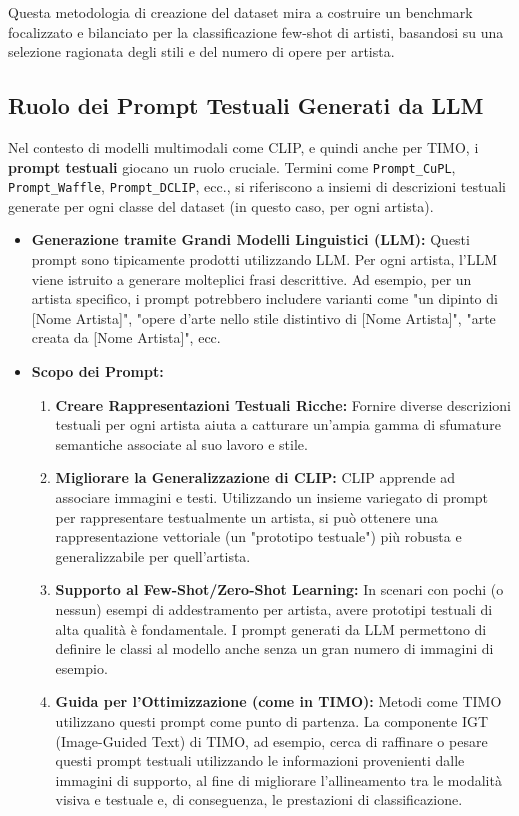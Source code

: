 \documentclass[11pt,a4paper]{article}
\begin{document}
Questa metodologia di creazione del dataset mira a costruire un benchmark focalizzato e bilanciato per la classificazione few-shot di artisti, basandosi su una selezione ragionata degli stili e del numero di opere per artista.

\subsection{Ruolo dei Prompt Testuali Generati da LLM}
Nel contesto di modelli multimodali come CLIP, e quindi anche per TIMO, i \textbf{prompt testuali} giocano un ruolo cruciale. Termini come \texttt{Prompt\_CuPL}, \texttt{Prompt\_Waffle}, \texttt{Prompt\_DCLIP}, ecc., si riferiscono a insiemi di descrizioni testuali generate per ogni classe del dataset (in questo caso, per ogni artista).
\begin{itemize}
    \item \textbf{Generazione tramite Grandi Modelli Linguistici (LLM):} Questi prompt sono tipicamente prodotti utilizzando LLM. Per ogni artista, l'LLM viene istruito a generare molteplici frasi descrittive. Ad esempio, per un artista specifico, i prompt potrebbero includere varianti come "un dipinto di [Nome Artista]", "opere d'arte nello stile distintivo di [Nome Artista]", "arte creata da [Nome Artista]", ecc.
    \item \textbf{Scopo dei Prompt:}
    \begin{enumerate}
        \item \textbf{Creare Rappresentazioni Testuali Ricche:} Fornire diverse descrizioni testuali per ogni artista aiuta a catturare un'ampia gamma di sfumature semantiche associate al suo lavoro e stile.
        \item \textbf{Migliorare la Generalizzazione di CLIP:} CLIP apprende ad associare immagini e testi. Utilizzando un insieme variegato di prompt per rappresentare testualmente un artista, si può ottenere una rappresentazione vettoriale (un "prototipo testuale") più robusta e generalizzabile per quell'artista.
        \item \textbf{Supporto al Few-Shot/Zero-Shot Learning:} In scenari con pochi (o nessun) esempi di addestramento per artista, avere prototipi testuali di alta qualità è fondamentale. I prompt generati da LLM permettono di definire le classi al modello anche senza un gran numero di immagini di esempio.
        \item \textbf{Guida per l'Ottimizzazione (come in TIMO):} Metodi come TIMO utilizzano questi prompt come punto di partenza. La componente IGT (Image-Guided Text) di TIMO, ad esempio, cerca di raffinare o pesare questi prompt testuali utilizzando le informazioni provenienti dalle immagini di supporto, al fine di migliorare l'allineamento tra le modalità visiva e testuale e, di conseguenza, le prestazioni di classificazione.
    \end{enumerate}
\end{itemize}
\end{document}
